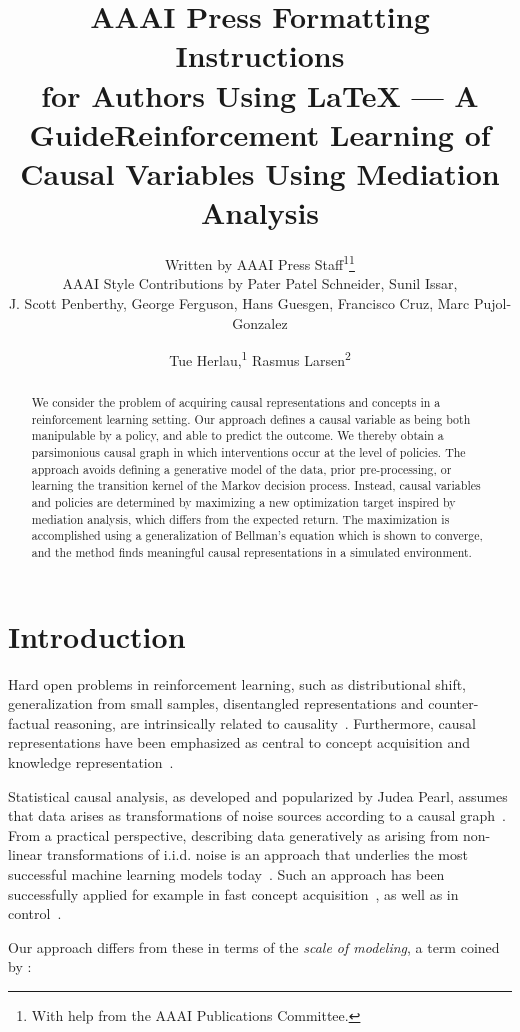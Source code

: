 \documentclass[letterpaper]{article} %
\title{AAAI Press Formatting Instructions \\for Authors Using \LaTeX{} --- A Guide}
\author{
	Written by AAAI Press Staff\textsuperscript{\rm 1}\thanks{With help from the AAAI Publications Committee.}\\
	AAAI Style Contributions by Pater Patel Schneider,
	Sunil Issar,\\
	J. Scott Penberthy,
	George Ferguson,
	Hans Guesgen,
	Francisco Cruz\equalcontrib,
	Marc Pujol-Gonzalez\equalcontrib
}
\title{Reinforcement Learning of Causal Variables Using Mediation Analysis}
\author {
	Tue Herlau,\textsuperscript{\rm 1}
	Rasmus Larsen\textsuperscript{\rm 2}
}
\begin{document}
	\maketitle

	\begin{abstract}
		We consider the problem of acquiring causal representations and concepts in a reinforcement learning setting.
		Our approach defines a causal variable as being both manipulable by a policy, and able to predict the outcome.
		We thereby obtain a parsimonious causal graph in which interventions occur at the level of policies.
		The approach avoids defining a generative model of the data, prior pre-processing, or learning the transition kernel of the Markov decision process.
		Instead, causal variables and policies are determined by maximizing a new optimization target inspired by mediation analysis, which differs from the expected return.
		The maximization is accomplished using a generalization of Bellman's equation which is shown to converge, and the method finds meaningful causal representations in a simulated environment.
	\end{abstract}

	\section{Introduction} \label{introduction}
	Hard open problems in reinforcement learning, such as distributional shift, generalization from small samples, disentangled representations and counter-factual reasoning, are intrinsically related to causality~\cite{scholkopf2019causality}. Furthermore, causal representations have been emphasized as central to concept acquisition and knowledge representation~\cite{Tenenbaum1279}.

	Statistical causal analysis, as developed and popularized by Judea Pearl, assumes that data arises as transformations of noise sources according to a causal graph~\cite{pearl2009causality}. From a practical perspective, describing data generatively as arising from non-linear transformations of i.i.d. noise is an approach that underlies the most successful machine learning models today~\cite{shrestha2019review}. Such an approach has been successfully applied for example in fast concept acquisition~\cite{Tenenbaum1279,lake2015human}, as well as in control~\cite{deisenroth2011pilco, levin}. %

	Our approach differs from these in terms of the \emph{scale of modeling}, a term coined by \citet{PetJanSch17}:
\end{document}

